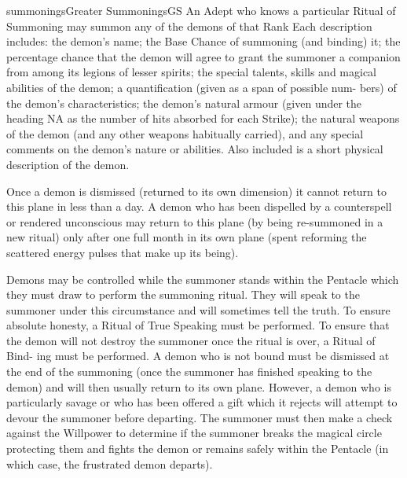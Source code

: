\begin{College}[1.0]{summonings}{Greater Summonings}{GS}
An Adept who knows a particular Ritual of Summoning may summon any of
the demons of that Rank Each description includes: the demon’s name;
the Base Chance of summoning (and binding) it; the percentage chance
that the demon will agree to grant the summoner a companion from among
its legions of lesser spirits; the special talents, skills and magical
abilities of the demon; a quantification (given as a span of possible
num- bers) of the demon’s characteristics; the demon’s natural armour
(given under the heading NA as the number of hits absorbed for each
Strike); the natural weapons of the demon (and any other weapons
habitually carried), and any special comments on the demon’s nature or
abilities.  Also included is a short physical description of the
demon.

Once a demon is dismissed (returned to its own dimension) it cannot
return to this plane in less than a day.  A demon who has been
dispelled by a counterspell or rendered unconscious may return to this
plane (by being re-summoned in a new ritual) only after one full month
in its own plane (spent reforming the scattered energy pulses that
make up its being).

Demons may be controlled while the summoner stands within the Pentacle
which they must draw to perform the summoning ritual.  They will speak
to the summoner under this circumstance and will sometimes tell the
truth.  To ensure absolute honesty, a Ritual of True Speaking must be
performed.  To ensure that the demon will not destroy the summoner
once the ritual is over, a Ritual of Bind- ing must be performed. A
demon who is not bound must be dismissed at the end of the summoning
(once the summoner has finished speaking to the demon) and will then
usually return to its own plane.  However, a demon who is particularly
savage or who has been offered a gift which it rejects will attempt to
devour the summoner before departing.  The summoner must then make a
check against the Willpower to determine if the summoner breaks the
magical circle protecting them and fights the demon or remains safely
within the Pentacle (in which case, the frustrated demon departs).


\end{College}
